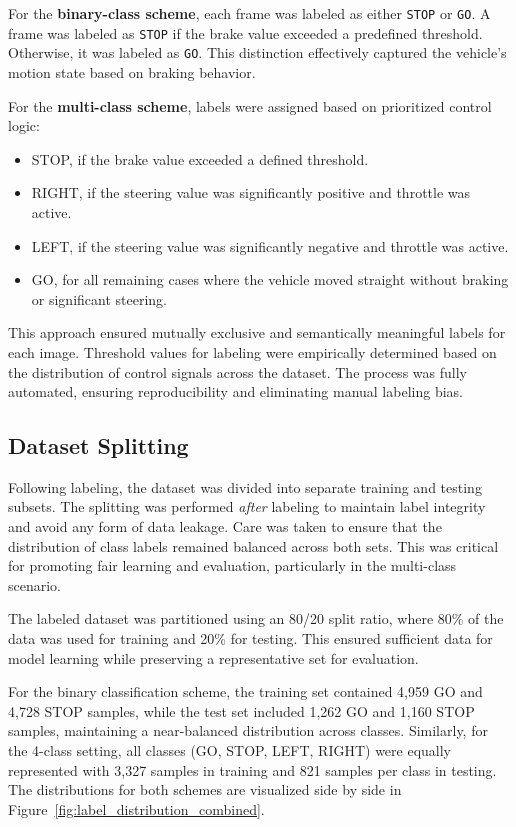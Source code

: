 For the \textbf{binary-class scheme}, each frame was labeled as either \texttt{STOP} or \texttt{GO}. A frame was labeled as \texttt{STOP} if the brake value exceeded a predefined threshold. Otherwise, it was labeled as \texttt{GO}. This distinction effectively captured the vehicle's motion state based on braking behavior.

For the \textbf{multi-class scheme}, labels were assigned based on prioritized control logic:
\begin{itemize}
    \item STOP, if the brake value exceeded a defined threshold.
    \item RIGHT, if the steering value was significantly positive and throttle was active.
    \item LEFT, if the steering value was significantly negative and throttle was active.
    \item GO, for all remaining cases where the vehicle moved straight without braking or significant steering.
\end{itemize}

This approach ensured mutually exclusive and semantically meaningful labels for each image. Threshold values for labeling were empirically determined based on the distribution of control signals across the dataset. The process was fully automated, ensuring reproducibility and eliminating manual labeling bias.

\subsection{Dataset Splitting}

Following labeling, the dataset was divided into separate training and testing subsets. The splitting was performed \textit{after} labeling to maintain label integrity and avoid any form of data leakage. Care was taken to ensure that the distribution of class labels remained balanced across both sets. This was critical for promoting fair learning and evaluation, particularly in the multi-class scenario.

The labeled dataset was partitioned using an 80/20 split ratio, where 80\% of the data was used for training and 20\% for testing. This ensured sufficient data for model learning while preserving a representative set for evaluation.

For the binary classification scheme, the training set contained 4,959 GO and 4,728 STOP samples, while the test set included 1,262 GO and 1,160 STOP samples, maintaining a near-balanced distribution across classes. Similarly, for the 4-class setting, all classes (GO, STOP, LEFT, RIGHT) were equally represented with 3,327 samples in training and 821 samples per class in testing. The distributions for both schemes are visualized side by side in Figure~\ref{fig:label_distribution_combined}.


